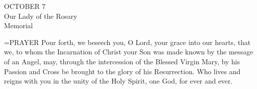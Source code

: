 \begin{center}\normalsize OCTOBER 7\\
\footnotesize Our Lady of the Rosary\\
\footnotesize Memorial\\
\end{center}

\hangindent=\parindent \small{PRAYER 
Pour forth, we beseech you, O Lord,
your grace into our hearts,
that we, to whom the Incarnation of Christ your Son
was made known by the message of an Angel,
may, through the intercession of the Blessed Virgin Mary,
by his Passion and Cross
be brought to the glory of his Resurrection.
Who lives and reigns with you in the unity of the Holy Spirit,
one God, for ever and ever.\\}
 
